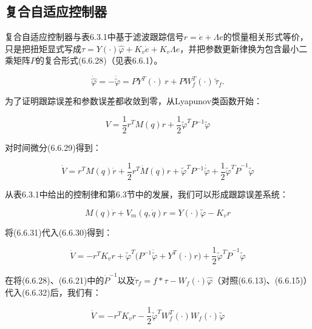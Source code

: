 \documentclass[12pt,a4paper]{ctexart}
\begin{document}
\subsection*{复合自适应控制器}

复合自适应控制器与表6.3.1中基于滤波跟踪信号$r=\dot{e}+\Lambda e$的惯量相关形式等价，只是把扭矩显式写成$\tau = Y(\cdot)\hat{\varphi} + K_v\dot{e} + K_v\Lambda e$，并把参数更新律换为包含最小二乘矩阵$P$的复合形式(6.6.28)（见表6.6.1）。

\begin{equation}\label{eq:6.6.28}
\dot{\hat{\varphi}} = -\dot{\tilde{\varphi}} = P Y^T(\cdot)\, r + P W_f^T(\cdot)\, \tilde{\tau}_f.
\end{equation}

为了证明跟踪误差和参数误差都收敛到零，从Lyapunov类函数开始：

\begin{equation}\label{eq:6.6.29}
V = \frac{1}{2}r^T M(q) r + \frac{1}{2}\tilde{\varphi}^T P^{-1} \tilde{\varphi}
\end{equation}

对时间微分(6.6.29)得到：

\begin{equation}\label{eq:6.6.30}
\dot{V} = r^T M(q)\dot{r} + \frac{1}{2}r^T \dot{M}(q)r + \tilde{\varphi}^T P^{-1} \dot{\tilde{\varphi}} + \frac{1}{2}\tilde{\varphi}^T \dot{P}^{-1} \tilde{\varphi}
\end{equation}

从表6.3.1中给出的控制律和第6.3节中的发展，我们可以形成跟踪误差系统：

\begin{equation}\label{eq:6.6.31}
M(q)\dot{r} + V_m(q, \dot{q})r = Y(\cdot)\tilde{\varphi} - K_v r
\end{equation}

将(6.6.31)代入(6.6.30)得到：

\begin{equation}\label{eq:6.6.32}
\dot{V} = -r^T K_v r + \tilde{\varphi}^T \bigl( P^{-1} \dot{\tilde{\varphi}} + Y^T(\cdot) r \bigr) + \frac{1}{2}\tilde{\varphi}^T \dot{P}^{-1} \tilde{\varphi}
\end{equation}

在将(6.6.28)、(6.6.21)中的$\dot{P}^{-1}$以及$\tilde{\tau}_f=f*\tau-W_f(\cdot)\hat{\varphi}$（对照(6.6.13)、(6.6.15)）代入(6.6.32)后，我们有：

\begin{equation}\label{eq:6.6.33}
\dot{V} = -r^T K_v r - \frac{1}{2}\tilde{\varphi}^T W_f^T(\cdot)W_f(\cdot)\tilde{\varphi}
\end{equation}
\end{document}
